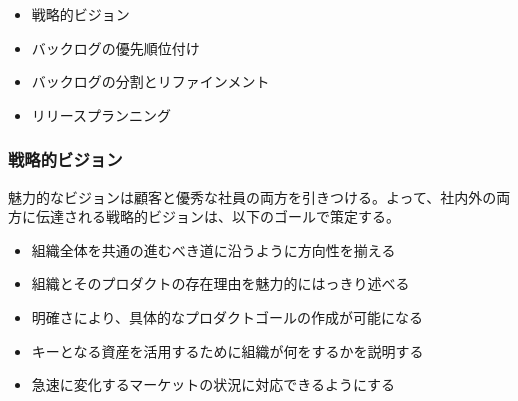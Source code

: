 \documentclass[12pt,a4paper,parskip=full]{scrartcl}
\begin{document}
\begin{itemize}
\itemsep1pt\parskip0pt

\item
戦略的ビジョン
\item
バックログの優先順位付け
\item
バックログの分割とリファインメント
\item
リリースプランニング
\end{itemize}

\subsubsection{戦略的ビジョン}\label{strategic-vision}

魅力的なビジョンは顧客と優秀な社員の両方を引きつける。よって、社内外の両方に伝達される戦略的ビジョンは、以下のゴールで策定する。

\begin{itemize}
\itemsep1pt\parskip0pt

\item
組織全体を共通の進むべき道に沿うように方向性を揃える
\item
組織とそのプロダクトの存在理由を魅力的にはっきり述べる
\item
明確さにより、具体的なプロダクトゴールの作成が可能になる
\item
キーとなる資産を活用するために組織が何をするかを説明する
\item
急速に変化するマーケットの状況に対応できるようにする
\end{itemize}
\end{document}
